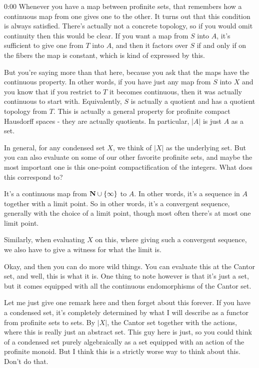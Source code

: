 \begin{unfinished}{0:00}
Whenever you have a map between profinite sets, that remembers how a continuous map from one gives one to the other. It turns out that this condition is always satisfied. There's actually not a concrete topology, so if you would omit continuity then this would be clear. If you want a map from $S$ into $A$, it's sufficient to give one from $T$ into $A$, and then it factors over $S$ if and only if on the fibers the map is constant, which is kind of expressed by this.

But you're saying more than that here, because you ask that the maps have the continuous property. In other words, if you have just any map from $S$ into $X$ and you know that if you restrict to $T$ it becomes continuous, then it was actually continuous to start with. Equivalently, $S$ is actually a quotient and has a quotient topology from $T$. This is actually a general property for profinite compact Hausdorff spaces - they are actually quotients. In particular, $|A|$ is just $A$ as a set.

In general, for any condensed set $X$, we think of $|X|$ as the underlying set. But you can also evaluate on some of our other favorite profinite sets, and maybe the most important one is this one-point compactification of the integers. What does this correspond to?

It's a continuous map from $\mathbf N \cup \{\infty\}$ to $A$. In other words, it's a sequence in $A$ together with a limit point. So in other words, it's a convergent sequence, generally with the choice of a limit point, though most often there's at most one limit point. 

Similarly, when evaluating $X$ on this, where giving such a convergent sequence, we also have to give a witness for what the limit is.

Okay, and then you can do more wild things. You can evaluate this at the Cantor set, and well, this is what it is. One thing to note however is that it's just a set, but it comes equipped with all the continuous endomorphisms of the Cantor set.

Let me just give one remark here and then forget about this forever. If you have a condensed set, it's completely determined by what I will describe as a functor from profinite sets to sets. By $|X|$, the Cantor set together with the actions, where this is really just an abstract set. This guy here is just, so you could think of a condensed set purely algebraically as a set equipped with an action of the profinite monoid. But I think this is a strictly worse way to think about this. Don't do that.


\end{unfinished}
